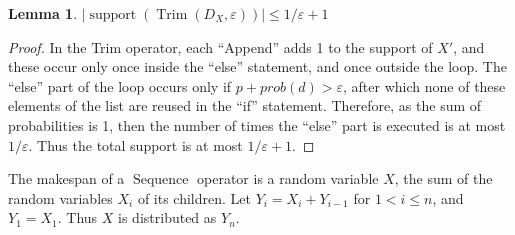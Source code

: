 \documentclass[review]{elsarticle}
\newtheorem{lemma}{Lemma}
\DeclareMathOperator{\Trim}{Trim}
\DeclareMathOperator{\Sequence}{Sequence}
\begin{document}

\begin{lemma} \label{SizeD}
$|\operatorname{support}(\Trim(D_X,\varepsilon))| \leq 1/\varepsilon +1$
\end{lemma}

\begin{proof}
In the Trim operator, each ``Append'' adds 1 to the support of $X'$, and these occur only once inside
the ``else'' statement, and once outside the loop.
The ``else'' part of the loop occurs only if $p+prob(d)> \varepsilon$,
after which none of these elements of the list are reused in the ``if'' statement.
Therefore, as the sum of probabilities is 1, then the number of times
the ``else'' part is executed is at most ${1}/{\varepsilon}$. Thus the total support
is at most ${1}/{\varepsilon}+1$.
\end{proof}





The makespan of a $\Sequence$ operator is a random variable $X$, the sum 
of the random variables $X_i$ of its children.
Let $Y_i = X_i + Y_{i-1}$ for $1< i \leq n$, and $Y_1=X_1$.
Thus $X$ is distributed as $Y_n$.
\end{document}
